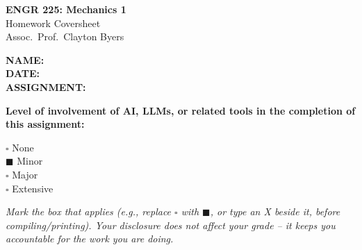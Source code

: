 \documentclass[11pt]{article}
\newcommand{\assignmentNumber}{6}
\newcommand{\assignedDate}{23 Oct 2026}
\newcommand{\dueDate}{2 Nov 2026}
\begin{document}
\begin{titlepage}
    \centering
    \vspace*{2cm}
    {\LARGE \bfseries ENGR 225: Mechanics 1} \\[0.3cm]
    {\Large Homework Coversheet} \\[0.3cm]
    {\large Assoc.\ Prof.\ Clayton Byers} \\[2cm]

    \begin{flushleft}
        \Large
        \textbf{NAME:} \underline{} \\[1cm]
        \textbf{DATE:} \underline{\hspace{10cm}} \\[1cm]
        \textbf{ASSIGNMENT:} \underline{} \\[2cm]
    \end{flushleft}

    \large
    \textbf{Level of involvement of AI, LLMs, or related tools in the completion of this assignment:}

    \vspace{1cm}

    \begin{flushleft}
        \Large
        $\square$ \quad None \\[0.7cm]
        $\blacksquare$ \quad Minor \\[0.7cm]
        $\square$ \quad Major \\[0.7cm]
        $\square$ \quad Extensive \\[1.5cm]
    \end{flushleft}

    \normalsize
    \textit{Mark the box that applies (e.g., replace $\square$ with $\blacksquare$, or type an X beside it, before compiling/printing). Your disclosure does not affect your grade -- it keeps you accountable for the work you are doing.}
\end{titlepage}


\end{document}
